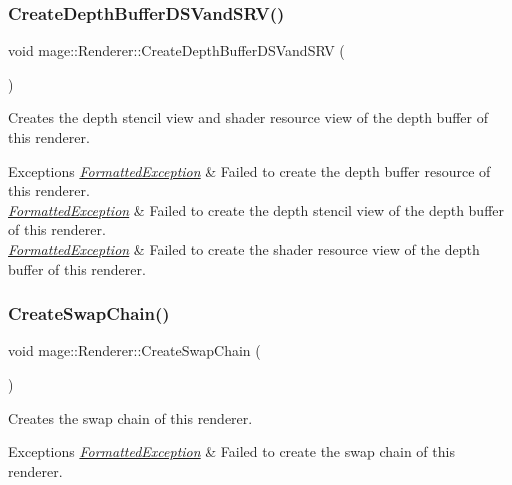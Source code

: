 \subsubsection{\texorpdfstring{Create\+Depth\+Buffer\+D\+S\+Vand\+S\+R\+V()}{CreateDepthBufferDSVandSRV()}}
{\footnotesize\ttfamily void mage\+::\+Renderer\+::\+Create\+Depth\+Buffer\+D\+S\+Vand\+S\+RV (\begin{DoxyParamCaption}{ }\end{DoxyParamCaption})\hspace{0.3cm}{\ttfamily [private]}}

Creates the depth stencil view and shader resource view of the depth buffer of this renderer.


\begin{DoxyExceptions}{Exceptions}
{\em \hyperlink{structmage_1_1_formatted_exception}{Formatted\+Exception}} & Failed to create the depth buffer resource of this renderer. \\
\hline
{\em \hyperlink{structmage_1_1_formatted_exception}{Formatted\+Exception}} & Failed to create the depth stencil view of the depth buffer of this renderer. \\
\hline
{\em \hyperlink{structmage_1_1_formatted_exception}{Formatted\+Exception}} & Failed to create the shader resource view of the depth buffer of this renderer. \\
\hline
\end{DoxyExceptions}
\hypertarget{classmage_1_1_renderer_a1bd77bf54ea3a7867691785efd183013}{}\label{classmage_1_1_renderer_a1bd77bf54ea3a7867691785efd183013} 
\subsubsection{\texorpdfstring{Create\+Swap\+Chain()}{CreateSwapChain()}}
{\footnotesize\ttfamily void mage\+::\+Renderer\+::\+Create\+Swap\+Chain (\begin{DoxyParamCaption}{ }\end{DoxyParamCaption})\hspace{0.3cm}{\ttfamily [private]}}

Creates the swap chain of this renderer.


\begin{DoxyExceptions}{Exceptions}
{\em \hyperlink{structmage_1_1_formatted_exception}{Formatted\+Exception}} & Failed to create the swap chain of this renderer. \\
\hline
\end{DoxyExceptions}
\hypertarget{classmage_1_1_renderer_ac4b5290432db9c566c1accd98c311e0e}{}\label{classmage_1_1_renderer_ac4b5290432db9c566c1accd98c311e0e} 
